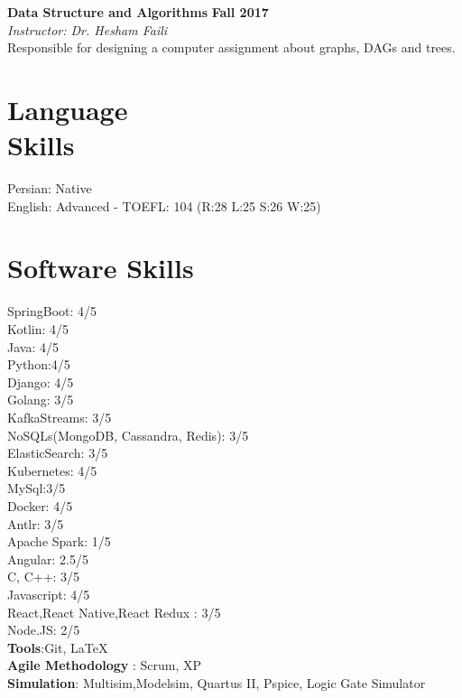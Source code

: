 \documentclass[line, mm]{sampleCV}
\begin{document}
\begin{resume}
\textbf{Data Structure and Algorithms} \hfill \textbf{Fall 2017}\\
{\it Instructor:  Dr. Hesham Faili}\\
Responsible for designing a computer assignment about graphs, DAGs and trees.



    \section{\mysidestyle Language\\Skills}
Persian: Native\\
English: Advanced - TOEFL: 104 (R:28 L:25 S:26 W:25)\\

    \section{\mysidestyle Software Skills}

SpringBoot: 4/5\\Kotlin: 4/5\\ Java: 4/5 \\ Python:4/5\\ Django: 4/5 \\ Golang: 3/5 \\ KafkaStreams: 3/5\\NoSQLs(MongoDB, Cassandra, Redis): 3/5 \\ ElasticSearch: 3/5  \\ Kubernetes: 4/5 \\ MySql:3/5 \\Docker: 4/5 \\ Antlr: 3/5 \\  Apache Spark: 1/5\\
Angular: 2.5/5 \\
 C, C++: 3/5\\Javascript: 4/5\\
 React,React Native,React Redux : 3/5 \\Node.JS: 2/5\\ 
\textbf{Tools}:Git, \LaTeX \\
\textbf{Agile Methodology} : Scrum, XP \\
\textbf{Simulation}: Multisim,Modelsim, Quartus II, Pspice, Logic Gate Simulator

\end{resume}
\end{document}
